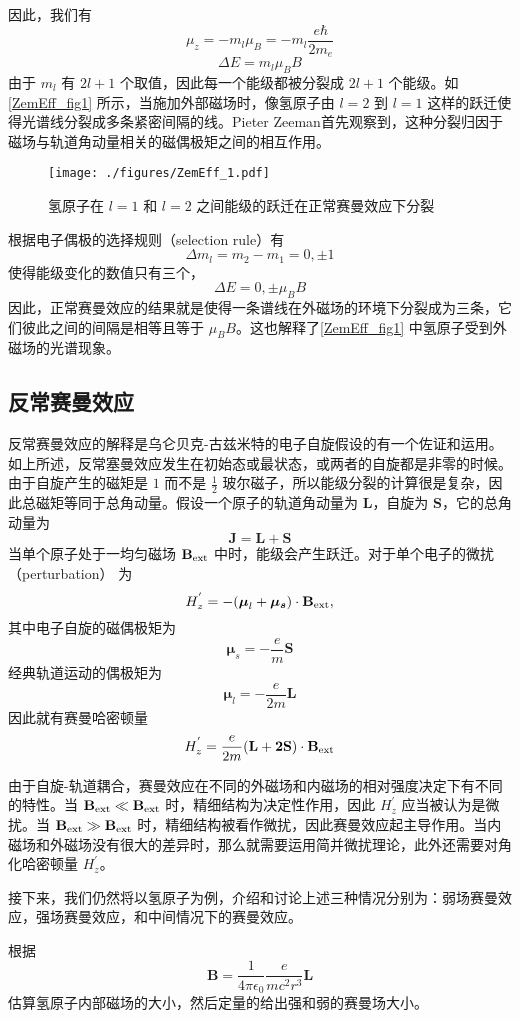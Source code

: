 因此，我们有$$\mu_z=-m_l\mu_B=-m_l\frac{e\hbar}{2m_e}$$
\begin{equation}
\Delta E = m_l\mu_B B
\end{equation}
由于 $m_l$ 有 $2l+1$ 个取值，因此每一个能级都被分裂成 $2l+1$ 个能级。如\autoref{ZemEff_fig1} 所示，当施加外部磁场时，像氢原子由 $l=2$ 到 $l=1$ 这样的跃迁使得光谱线分裂成多条紧密间隔的线。Pieter Zeeman首先观察到，这种分裂归因于磁场与轨道角动量相关的磁偶极矩之间的相互作用。
\begin{figure}[ht]
\centering
\texttt{[image: ./figures/ZemEff\_1.pdf]}
\caption{氢原子在 $l=1$ 和 $l=2$ 之间能级的跃迁在正常赛曼效应下分裂} \label{ZemEff_fig1}
\end{figure}
根据电子偶极的选择规则（selection rule）有
$$
\Delta m_l = m_2-m_1=0, \pm 1
$$
使得能级变化的数值只有三个，
$$
\Delta E = 0,\pm \mu_B B
$$
因此，正常赛曼效应的结果就是使得一条谱线在外磁场的环境下分裂成为三条，它们彼此之间的间隔是相等且等于 $\mu_B B$。这也解释了\autoref{ZemEff_fig1} 中氢原子受到外磁场的光谱现象。
\subsection{反常赛曼效应}
反常赛曼效应的解释是乌仑贝克-古兹米特的电子自旋假设的有一个佐证和运用。如上所述，反常塞曼效应发生在初始态或最状态，或两者的自旋都是非零的时候。由于自旋产生的磁矩是 $1$ 而不是 $\frac{1}{2}$ 玻尔磁子，所以能级分裂的计算很是复杂，因此总磁矩等同于总角动量。假设一个原子的轨道角动量为 $\mathbf{L}$，自旋为 $\mathbf{S}$，它的总角动量为
$$\mathbf{J=L+S}$$
当单个原子处于一均匀磁场 $\mathbf{B}_{\rm{ext}}$ 中时，能级会产生跃迁。对于单个电子的微扰（perturbation） 为
$$H_z^{'} = -(\boldsymbol{\mu}_l+\boldsymbol{\mu_s})\cdot \mathbf{B}_{\rm{ext}},$$
其中电子自旋的磁偶极矩为$$\boldsymbol\mu _s =-\frac{e}{m}\mathbf{S}$$经典轨道运动的偶极矩为
$$\boldsymbol\mu _l =-\frac{e}{2m}\mathbf{L}$$
因此就有赛曼哈密顿量
\begin{equation}\label{ZemEff_eq5}
H_z^{'} = \frac{e}{2m}(\mathbf{L+2S})\cdot \mathbf{B}_{\rm{ext}}
\end{equation}

由于自旋-轨道耦合，赛曼效应在不同的外磁场和内磁场的相对强度决定下有不同的特性。当 $\mathbf{B}_{\rm{ext}}\ll \mathbf{B}_{\rm{ext}}$ 时，精细结构为决定性作用，因此 $H_z^{'}$ 应当被认为是微扰。当 $\mathbf{B}_{\rm{ext}}\gg \mathbf{B}_{\rm{ext}}$ 时，精细结构被看作微扰，因此赛曼效应起主导作用。当内磁场和外磁场没有很大的差异时，那么就需要运用简并微扰理论，此外还需要对角化哈密顿量 $H_z^{'}$。

接下来，我们仍然将以氢原子为例，介绍和讨论上述三种情况分别为：弱场赛曼效应，强场赛曼效应，和中间情况下的赛曼效应。
\begin{exercise}{}
根据
\begin{equation}\label{ZemEff_eq17}
\mathbf{B}=\frac{1}{4\pi\epsilon_0}\frac{e}{mc^2r^3}\mathbf{L}
\end{equation}
估算氢原子内部磁场的大小，然后定量的给出强和弱的赛曼场大小。
\end{exercise}
